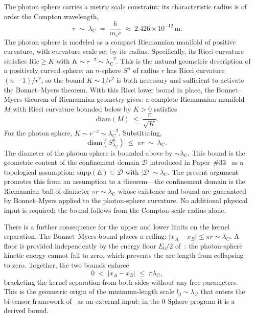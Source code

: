 \documentclass[%
 reprint, amsmath,amssymb, aps, prb, ]{revtex4-2}
\numberwithin{equation}{section}
\newcommand{\lambdaC}{\lambda_{\mathrm{C}}}
\begin{document}
The photon sphere carries a metric scale constraint: its characteristic radius is of order the Compton wavelength,
\begin{equation}
r \;\sim\; \lambdaC \;=\; \frac{h}{m_e c} \;\approx\; 2.426\times10^{-12}\,\mathrm{m}.
\label{eq:photon_sphere_radius}
\end{equation}
The photon sphere is modeled as a compact Riemannian manifold of positive curvature, with curvature scale set by its radius. Specifically, its Ricci curvature satisfies $\mathrm{Ric} \geq K$ with $K \sim r^{-2} \sim \lambdaC^{-2}$. This is the natural geometric description of a positively curved sphere: an $n$-sphere $S^n$ of radius $r$ has Ricci curvature $(n-1)/r^2$, so the bound $K \sim 1/r^2$ is both necessary and sufficient to activate the Bonnet--Myers theorem. With this Ricci lower bound in place, the Bonnet--Myers theorem of Riemannian geometry gives: a complete Riemannian manifold $M$ with Ricci curvature bounded below by $K > 0$ satisfies
\begin{equation}
\mathrm{diam}(M) \;\leq\; \frac{\pi}{\sqrt{K}}.
\label{eq:bonnet_myers}
\end{equation}
For the photon sphere, $K\sim r^{-2}\sim\lambdaC^{-2}$. Substituting,
\begin{equation}
\mathrm{diam}(S^n_{\lambdaC}) \;\leq\; \pi r \;\sim\; \lambdaC.
\label{eq:diameter_bound}
\end{equation}
The diameter of the photon sphere is bounded above by $\sim\lambdaC$. This bound is the geometric content of the confinement domain $\mathcal{D}$ introduced in Paper~\#33~\cite{hanamura33} as a topological assumption: $\mathrm{supp}(E)\subset\mathcal{D}$ with $|\mathcal{D}|\sim\lambdaC$. The present argument promotes this from an assumption to a theorem---the confinement domain is the Riemannian ball of diameter $\pi r\sim\lambdaC$ whose existence and bound are guaranteed by Bonnet--Myers applied to the photon-sphere curvature. No additional physical input is required; the bound follows from the Compton-scale radius alone.

There is a further consequence for the upper and lower limits on the kernel separation. The Bonnet--Myers bound places a ceiling: $|x_A - x_B| \leq \pi r \sim \lambdaC$. A floor is provided independently by the energy floor $E_0/2$ of~\cite{hanamura46}: the photon-sphere kinetic energy cannot fall to zero, which prevents the arc length from collapsing to zero. Together, the two bounds enforce
\begin{equation}
0 \;<\; |x_A - x_B| \;\leq\; \pi\lambdaC,
\label{eq:separation_bounds}
\end{equation}
bracketing the kernel separation from both sides without any free parameters. This is the geometric origin of the minimum-length scale $l_0\sim\lambdaC$ that enters the bi-tensor framework of~\cite{Kothawala2023} as an external input; in the 0-Sphere program it is a derived bound.
\end{document}
